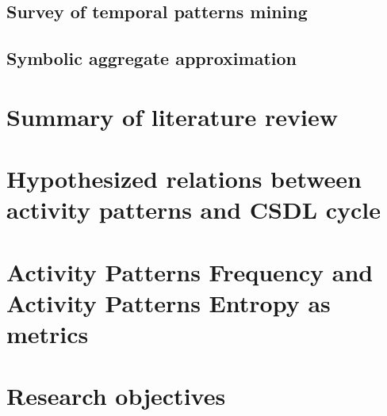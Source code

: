 \subsection{Survey of temporal patterns mining}
\subsection{Symbolic aggregate approximation}

\section{Summary of literature review}

\section{Hypothesized relations between activity patterns and CSDL cycle}

\section{Activity Patterns Frequency and Activity Patterns Entropy as metrics}

\section{Research objectives}
